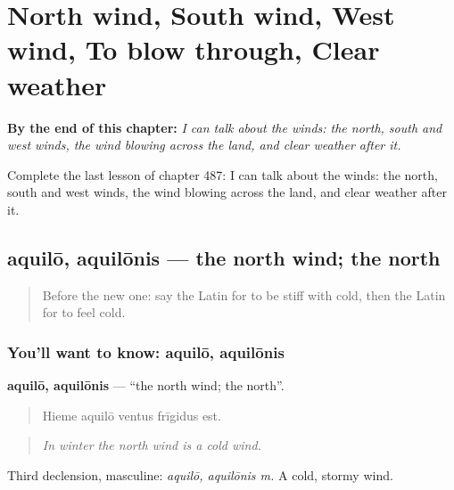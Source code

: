 
\chapter{North wind, South wind, West wind, To blow through, Clear weather}
\label{ch:la-north-wind-south-wind-west-wind-to-blow-through-clear-weather}

\begin{chapteropening}
\textbf{By the end of this chapter:} \emph{I can talk about the winds: the north, south and west winds, the wind blowing across the land, and clear weather after it.}

Complete the last lesson of chapter 487: I can talk about the winds: the north, south and west winds, the wind blowing across the land, and clear weather after it.
\end{chapteropening}

\section[aquilō, aquilōnis]{aquilō, aquilōnis — the north wind; the north}

\label{lesson:LA-C487-aquilo}



\begin{quote}
Before the new one: say the Latin for to be stiff with cold, then the Latin for to feel cold.
\end{quote}

\subsection*{You'll want to know: aquilō, aquilōnis}
\textbf{aquilō, aquilōnis} — \textquotedblleft{}the north wind; the north\textquotedblright{}.

\begin{quote}
Hieme aquilō ventus frīgidus est.
\end{quote}

\begin{quote}
\emph{In winter the north wind is a cold wind.}
\end{quote}

Third declension, masculine: \emph{aquilō, aquilōnis m.} A cold, stormy wind.

